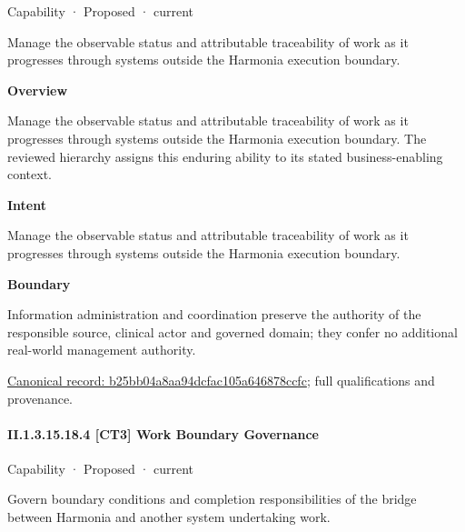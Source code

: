 \label{element:b25bb04a8aa94dcfac105a646878ccfc}
{\small Capability · Proposed · current}\par

Manage the observable status and attributable traceability of work as it progresses through systems outside the Harmonia execution boundary.



\textbf{Overview}



Manage the observable status and attributable traceability of work as it progresses through systems outside the Harmonia execution boundary. The reviewed hierarchy assigns this enduring ability to its stated business-enabling context.



\textbf{Intent}



Manage the observable status and attributable traceability of work as it progresses through systems outside the Harmonia execution boundary.



\textbf{Boundary}



Information administration and coordination preserve the authority of the responsible source, clinical actor and governed domain; they confer no additional real-world management authority.


{\footnotesize \href{../../../../continuum/strategy/capability/b25bb04a8aa94dcfac105a646878ccfc.md}{Canonical record: b25bb04a8aa94dcfac105a646878ccfc}; full qualifications and provenance.}\par
\paragraph*{II.1.3.15.18.4 [CT3] Work Boundary Governance}
\label{navigation:II.1.3.15.18.4}

\label{element:35b66a0b38db4568849ecb842ffdcbf3}
{\small Capability · Proposed · current}\par

Govern boundary conditions and completion responsibilities of the bridge between Harmonia and another system undertaking work.



